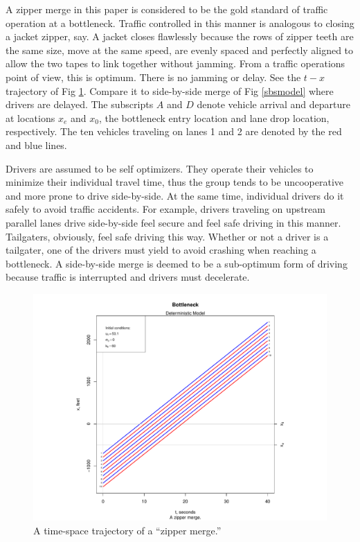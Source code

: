 \documentclass[Proceedings]{ascelike}
\begin{document}
A zipper merge in this paper is considered to be the gold standard of traffic operation at a bottleneck.  Traffic controlled  in this manner is analogous to  closing a jacket zipper, say. A jacket closes flawlessly because the rows of zipper teeth are the same size, move at the same speed, are evenly spaced and perfectly aligned to allow the two tapes to link together without jamming. From a traffic operations point of view, this is optimum. There is no jamming or delay. See the $t-x$ trajectory of Fig \ref{zipmodel}. Compare it to side-by-side merge of Fig \ref{sbsmodel} where drivers are delayed. The subscripts $A$ and $D$ denote  vehicle arrival and departure at locations $x_e$ and $x_0$, the bottleneck entry location and lane drop location, respectively. The ten vehicles traveling on lanes 1 and 2 are denoted by the red and blue lines. 

Drivers are assumed to be self optimizers.  They operate their vehicles to minimize their individual travel time, thus the group tends to be uncooperative and more prone to drive side-by-side. At the same time, individual drivers do it safely to avoid traffic accidents. For example, drivers traveling on upstream parallel lanes drive side-by-side feel secure and feel safe driving in this manner. Tailgaters, obviously, feel safe driving this way. Whether or not a driver is a tailgater, one of the drivers must yield to avoid crashing when reaching a bottleneck. A side-by-side merge is deemed to be a sub-optimum form of driving because traffic is interrupted and drivers must decelerate.  

\begin{figure}
\centering
\includegraphics[width = 5.5in]{Rplot01.pdf}
\caption{A time-space trajectory of a ``zipper merge.''}
\label{zipmodel}
\end{figure}
\end{document}
